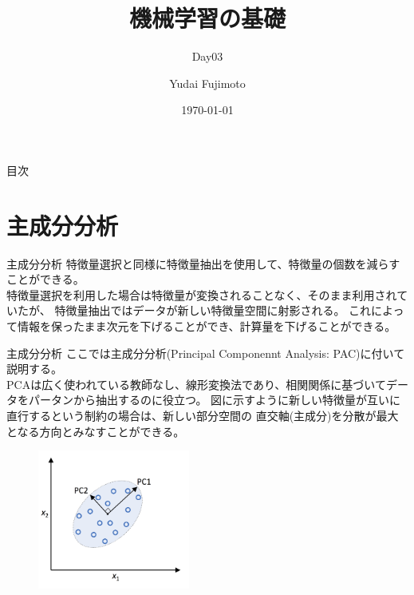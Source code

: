 \documentclass[aspectratio=169, dvipdfmx, 11pt]{beamer} %
\title[Day03]{機械学習の基礎}
\subtitle{Day03}
\author[Yudai Fujimoto]{Yudai Fujimoto}
\institute[SUS]{Suwa University of Science}
\date{\today}
\begin{document}
\maketitle

\begin{frame}{目次}
    \tableofcontents
\end{frame}

\section{主成分分析}
\begin{frame}{主成分分析}
    特徴量選択と同様に特徴量抽出を使用して、特徴量の個数を減らすことができる。\\
    特徴量選択を利用した場合は特徴量が変換されることなく、そのまま利用されていたが、
    特徴量抽出ではデータが新しい特徴量空間に射影される。
    これによって情報を保ったまま次元を下げることができ、計算量を下げることができる。
\end{frame}

\begin{frame}{主成分分析}
    ここでは主成分分析(Principal Componennt Analysis: PAC)に付いて説明する。 \\
    PCAは広く使われている教師なし、線形変換法であり、相関関係に基づいてデータをパータンから抽出するのに役立つ。
    図に示すように新しい特徴量が互いに直行するという制約の場合は、新しい部分空間の
    直交軸(主成分)を分散が最大となる方向とみなすことができる。
    \vspace{1em}
    \begin{figure}[b]
        \begin{center}
        \includegraphics[width=50mm]{img/day05/fig01.png}
        \end{center}
    \end{figure}
\end{frame}
\end{document}
